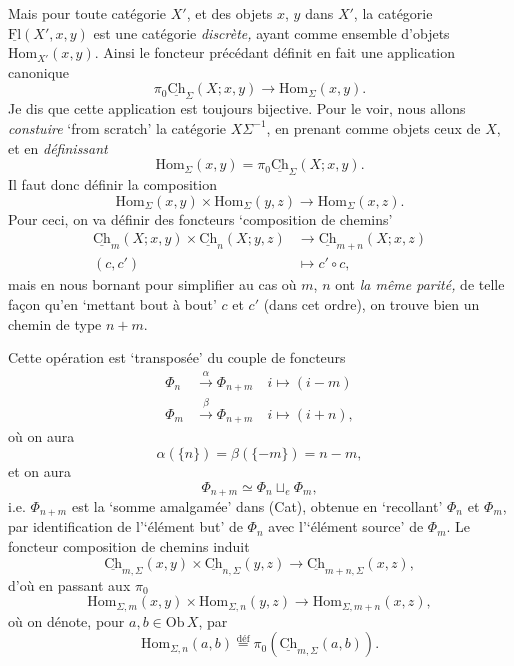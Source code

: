 \documentclass[11pt]{article}
\newcommand{\printedpage}[1]{\marginpar{\footnotesize p.~#1}}
\newcommand{\msp}[1]{\marginpar{\footnotesize [#1]}}
\newcommand{\uCh}{\underline{\mathrm{Ch}}}
\newcommand{\uFl}{\underline{\mathrm{Fl}}}
\newcommand{\Hom}{\mathrm{Hom}}
\begin{document}
Mais pour toute catégorie $X'$, et des objets $x$, $y$ dans $X'$, la catégorie $\uFl(X',x,y)$ est
\msp{page 8}
une catégorie \textit{discrète,} ayant comme ensemble d'objets $\Hom_{X'}(x,y)$. Ainsi le foncteur précédant définit en fait une application canonique %
\[
\boxed{\pi_0\uCh_\Sigma(X;x,y)\longrightarrow\Hom_\Sigma(x,y).}
\]
Je dis que cette application est toujours bijective. Pour le voir, nous allons \textit{constuire} `from scratch' la catégorie $X\Sigma^{-1}$, en prenant comme objets ceux de $X$, et en \textit{définissant} %
\[
\boxed{\Hom_\Sigma(x,y)=\pi_0\uCh_\Sigma(X;x,y).}
\]
Il faut donc définir la composition
\[
\Hom_\Sigma(x,y)\times\Hom_\Sigma(y,z)\longrightarrow\Hom_\Sigma(x,z).
\]
Pour ceci, on va définir des foncteurs `composition de chemins'
\[
\begin{aligned}
\uCh_m(X;x,y)\times\uCh_n(X;y,z) &\longrightarrow \uCh_{m+n}(X;x,z)\\
(c,c') &\longmapsto c'\circ c,
\end{aligned}
\]
mais en nous bornant pour simplifier au cas où $m$, $n$ ont \textit{la même parité,} de telle façon qu'en `mettant bout à bout' $c$ et $c'$ (dans cet ordre), on trouve bien un chemin de type $n+m$.

\msp{page 9}
Cette opération est `transposée' du couple de foncteurs
\[
\begin{aligned}
\Phi_n &\xrightarrow{\alpha} \Phi_{n+m}\quad i\longmapsto (i-m)\\
\Phi_m &\xrightarrow{\beta} \Phi_{n+m}\quad i\longmapsto (i+n),
\end{aligned}
\]
\printedpage{7}
où on aura
\[
\alpha(\{n\})=\beta(\{-m\})=n-m,
\]
et on aura
\[
\Phi_{n+m}\simeq\Phi_n\sqcup_e\Phi_m,
\]
i.e. $\Phi_{n+m}$ est la `somme amalgamée' dans (Cat), obtenue en `recollant' $\Phi_n$ et $\Phi_m$, par identification de l'`élément but' de $\Phi_n$ avec l'`élément source' de $\Phi_m$. Le foncteur composition de chemins induit
\[
\uCh_{m,\Sigma}(x,y)\times\uCh_{n,\Sigma}(y,z)\longrightarrow\uCh_{m+n,\Sigma}(x,z),
\]
d'où en passant aux $\pi_0$
\[
\Hom_{\Sigma,m}(x,y)\times\Hom_{\Sigma,n}(y,z)\longrightarrow\Hom_{\Sigma,m+n}(x,z),
\]
où on dénote, pour $a,b\in\mathrm{Ob}\,X$, par
\[
\Hom_{\Sigma,n}(a,b)\overset{\text{déf}}{=}\pi_0(\uCh_{m,\Sigma}(a,b)).
\]
\end{document}
